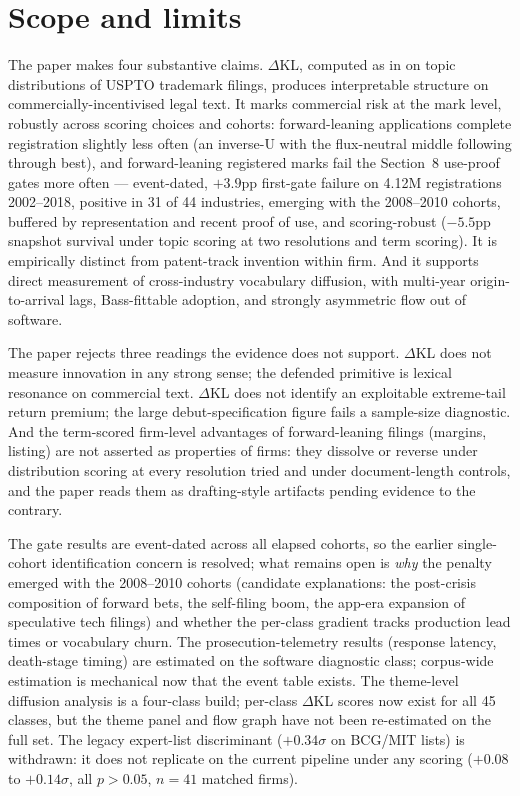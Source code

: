 \documentclass[11pt]{article}
\newcommand{\dkl}{$\Delta$KL}
\begin{document}
\section{Scope and limits}\label{sec:scope}

The paper makes four substantive claims. \dkl{}, computed as in
\citet{Murdock2017, Barron2018} on topic distributions of USPTO trademark
filings, produces interpretable structure on commercially-incentivised
legal text. It marks commercial risk at the mark level, robustly across
scoring choices and cohorts: forward-leaning applications complete
registration slightly less often (an inverse-U with the flux-neutral
middle following through best), and forward-leaning registered marks fail
the Section~8 use-proof gates more often --- event-dated, $+3.9$pp
first-gate failure on 4.12M registrations 2002--2018, positive in 31 of 44
industries, emerging with the 2008--2010 cohorts, buffered by
representation and recent proof of use, and scoring-robust ($-5.5$pp
snapshot survival under topic scoring at two resolutions and term
scoring). It is empirically distinct from patent-track invention within
firm. And it supports direct measurement of cross-industry vocabulary
diffusion, with multi-year origin-to-arrival lags, Bass-fittable adoption,
and strongly asymmetric flow out of software.

The paper rejects three readings the evidence does not support. \dkl{}
does not measure innovation in any strong sense; the defended primitive
is lexical resonance on commercial text. \dkl{} does not identify an
exploitable extreme-tail return premium; the large debut-specification
figure fails a sample-size diagnostic. And the term-scored firm-level
advantages of forward-leaning filings (margins, listing) are not asserted
as properties of firms: they dissolve or reverse under distribution
scoring at every resolution tried and under document-length controls,
and the paper reads them as drafting-style artifacts pending evidence to
the contrary.

The gate results are event-dated across all elapsed cohorts, so the
earlier single-cohort identification concern is resolved; what remains
open is \emph{why} the penalty emerged with the 2008--2010 cohorts
(candidate explanations: the post-crisis composition of forward bets, the
self-filing boom, the app-era expansion of speculative tech filings) and
whether the per-class gradient tracks production lead times or
vocabulary churn. The prosecution-telemetry results (response latency,
death-stage timing) are estimated on the software diagnostic class;
corpus-wide estimation is mechanical now that the event table exists.
The theme-level diffusion analysis is a four-class build; per-class
\dkl{} scores now exist for all 45 classes, but the theme panel and flow
graph have not been re-estimated on the full set. The legacy expert-list
discriminant ($+0.34\sigma$ on BCG/MIT lists) is withdrawn: it does not
replicate on the current pipeline under any scoring ($+0.08$ to
$+0.14\sigma$, all $p > 0.05$, $n = 41$ matched firms).
\end{document}
